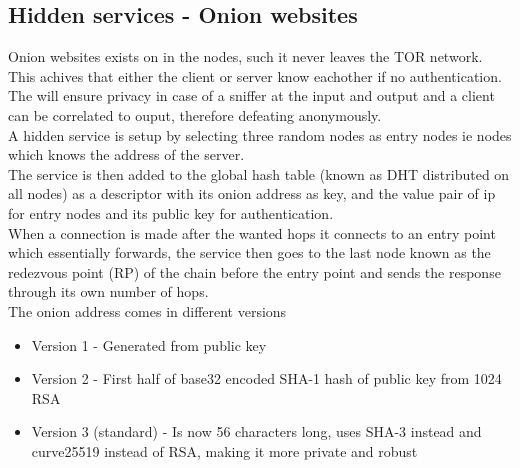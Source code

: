 \documentclass[12pt, a4paper]{article}
\begin{document}
		\subsection{Hidden services - Onion websites}
			Onion websites exists on in the nodes, such it never leaves the TOR network.\\
			This achives that either the client or server know eachother if no authentication.\\
			The will ensure privacy in case of a sniffer at the input and output and a client can be correlated to ouput, therefore defeating anonymously.\\
			A hidden service is setup by selecting three random nodes as entry nodes ie nodes which knows the address of the server.\\
			The service is then added to the global hash table (known as DHT distributed on all nodes) as a descriptor with its onion address as key, and the value pair of ip for entry nodes and its public key for authentication.\\
			When a connection is made after the wanted hops it connects to an entry point which essentially forwards, the service then goes to the last node known as the redezvous point (RP) of the chain before the entry point and sends the response through its own number of hops.\\
			The onion address comes in different versions
			\begin{itemize}
				\item Version 1 - Generated from public key
				\item Version 2 - First half of base32 encoded SHA-1 hash of public key from 1024 RSA 
				\item Version 3 (standard) - Is now 56 characters long, uses SHA-3 instead and curve25519 instead of RSA, making it more private and robust
			\end{itemize}
			
			
			
			
\end{document}
